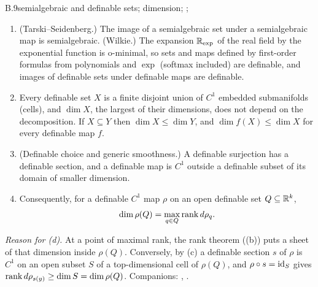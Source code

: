\begin{auxresult}{B.9}{semialgebraic and definable sets; dimension}{\citep[Ch.~2 and 9]{xbochnak1998real};
\citep[Ch.~4, 6 and 7]{xvandendries1998tame}; \citep{xwilkie1996model}}
\begin{enumerate}[label=(\alph*)]
  \item (Tarski--Seidenberg.) The image of a semialgebraic set under a semialgebraic map is semialgebraic.
    (Wilkie.) The expansion $\mathbb{R}_{\exp}$ of the real field by the exponential function is o-minimal, so sets and maps
    defined by first-order formulas from polynomials and $\exp$ (softmax included) are definable, and images of
    definable sets under definable maps are definable.
  \item Every definable set $X$ is a finite disjoint union of $C^1$ embedded submanifolds (cells), and $\dim X$, the
    largest of their dimensions, does not depend on the decomposition. If $X\subseteq Y$ then $\dim X\le\dim Y$, and
    $\dim f(X)\le\dim X$ for every definable map $f$.
  \item (Definable choice and generic smoothness.) A definable surjection has a definable section, and a definable map
    is $C^1$ outside a definable subset of its domain of smaller dimension.
  \item Consequently, for a definable $C^1$ map $\rho$ on an open definable set $Q\subseteq\mathbb{R}^k$,
    \begin{equation*}
      \dim\rho(Q)=\max_{q\in Q}\operatorname{rank} d\rho_q .
    \end{equation*}
\end{enumerate}
\end{auxresult}
\noindent\emph{Reason for (d).} At a point of maximal rank, the rank theorem ((b)) puts a sheet of that
dimension inside $\rho(Q)$. Conversely, by (c) a definable section $s$ of $\rho$ is $C^1$ on an open subset $S$ of a
top-dimensional cell of $\rho(Q)$, and $\rho\circ s=\mathrm{id}_S$ gives $\operatorname{rank} d\rho_{s(y)}\ge\dim S=\dim\rho(Q)$. Companions:
, .

